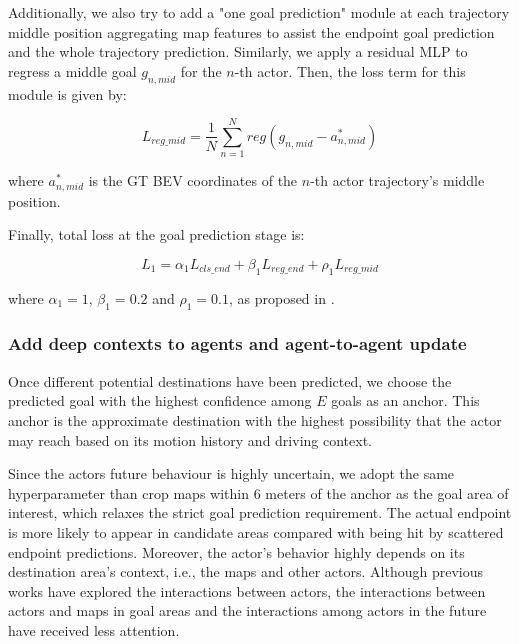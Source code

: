 Additionally, we also try to add a "one goal prediction" module at each trajectory middle position aggregating map features to assist the endpoint goal prediction and the whole trajectory prediction. Similarly, we apply a residual \ac{MLP} to regress a middle goal $g_{n,mid}$ for the $n$-th actor. Then, the loss term for this module is given by:

\begin{equation}
	L_{reg\_mid} = \frac{1}{N}\sum_{n=1}^N {reg(g_{n,mid}-a^*_{n,mid})}
\end{equation}

where $a^*_{n,mid}$ is the \ac{GT} \ac{BEV} coordinates of the $n$-th actor trajectory's middle position.

Finally, total loss at the goal prediction stage is:

\begin{equation}
	L_{1} = \alpha_1 L_{cls\_end} + \beta_1 L_{reg\_end} +\rho_1 L_{reg\_mid}
\end{equation}

where $\alpha_1 = 1$, $\beta_1 = 0.2$ and $\rho_1 = 0.1$, as proposed in \cite{wang2022ganet}.

\subsubsection{Add deep contexts to agents and agent-to-agent update}
\label{subsubsec:7_improving_efficiency_add_deep_context}

Once different potential destinations have been predicted, we choose the predicted goal with the highest confidence among $E$ goals as an anchor. This anchor is the approximate destination with the highest possibility that the actor may reach based on its motion history and driving context.


Since the actors future behaviour is highly uncertain, we adopt the same hyperparameter than  crop maps within 6 meters of the anchor as the goal area of interest, which relaxes the strict goal prediction requirement. The actual endpoint is more likely to appear in candidate areas compared with being hit by scattered endpoint predictions.
Moreover, the actor's behavior highly depends on its destination area's context, i.e., the maps and other actors. Although previous works have explored the interactions between actors, the interactions between actors and maps in goal areas and the interactions among actors in the future have received less attention. 

